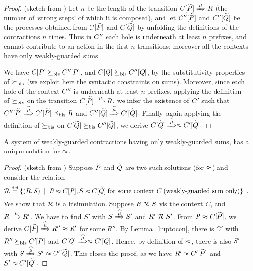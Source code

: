 \begin{proof}{(sketch from \cite{sangiorgi2017equations})}
Let $n$ be the length of the transition $\ct{\til P}\Arr\mu R$  (the
number of `strong steps' of which it is composed), and  
let $C'' [\widetilde P]$ and $C'' [\widetilde Q]$  be the processes obtained
from  $C [\widetilde P]$ and $C [\widetilde Q]$ by unfolding the definitions
of the contractions $n$ times. Thus in $C''$ each hole is
underneath at least $n$ prefixes, and cannot contribute to an action
in the first $n$ transitions; moreover all the contexts have only
weakly-guarded sums.

We have $C [\widetilde P] \mathrel{\succeq_{\rm{bis}}} C'' [\widetilde P]$, and 
$C [\widetilde Q] \mathrel{\succeq_{\rm{bis}}} C'' [\widetilde Q]$, 
 by the substitutivity  properties of $\mathrel{\succeq_{\rm{bis}}}$ (we exploit here
 the syntactic constraints on sums). Moreover,
 since each hole of the  context $C''$ is underneath at least $n$
 prefixes, applying  
the definition
 of $ \mathrel{\succeq_{\rm{bis}}}$ on the transition 
 $\ct{\til P}\Arr{\mu}  R$, we infer the existence
 of $C'$ such that 
$
\ctpp{\til P}\Arcap{\mu} \ctp{\til P} \mexpaBIS R
$
and 
$
\ctpp{\til Q}\Arcap{\mu}  \ctp{\til Q} 
. $
Finally, again applying the definition of $\mathrel{\succeq_{\rm{bis}}}$ on 
$C [\widetilde Q] \mathrel{\succeq_{\rm{bis}}} C'' [\widetilde Q]$, 
we derive 
$
\ct{\til Q}\Arcap{\mu}  \wb \ctp{\til Q} 
.$
\end{proof}

\begin{theorem}
\label{t:contraBisimulationU}
A system of weakly-guarded contractions
having only weakly-guarded sums, has a unique solution for $\approx$.
\end{theorem}

\begin{proof}{(sketch from \cite{sangiorgi2017equations})}
Suppose $\widetilde P$ and $\widetilde Q$ are two such solutions (for $\approx$) and consider
the relation
\begin{equation}
\label{eq:R}
{\cal R} \stackrel{\mbox{\scriptsize def}}{=} \{ 
(R,S) \; \mid \; R \approx C [\widetilde P], S \approx C [\widetilde Q] \mbox{ for some context
$C$ (weakly-guarded sum only)} \} \enspace.
\end{equation}
We show that ${\cal R}$ is a bisimulation. Suppose $R\ {\cal R}\ S$ vis the context
$C$, and $R \arr{\mu} R'$. We have to find $S'$ with $S \Arcap{\mu}
S'$ and $R'\ {\cal R}\ S'$. From $R \approx C[{\widetilde P}]$, we derive $C[{\til P}]
\Arcap{\mu} R'' \wb R'$ for some $R''$. By Lemma~\ref{l:uptocon},
there is $C'$ with $R'' \mathrel{\succeq_{\rm{bis}}} C'[{\widetilde P}]$ and $C[{\til Q}]
\Arcap{\mu} \wb C'[{\til Q}]$. Hence, by definition of $\approx$, there is
also $S'$ with $S \Arcap{\mu} S' \wb C'[{\til Q}]$. This closes the
proof, as we have $R' \approx C'[{\widetilde P}]$ and $S' \approx C'[{\widetilde Q}]$.
\end{proof}

